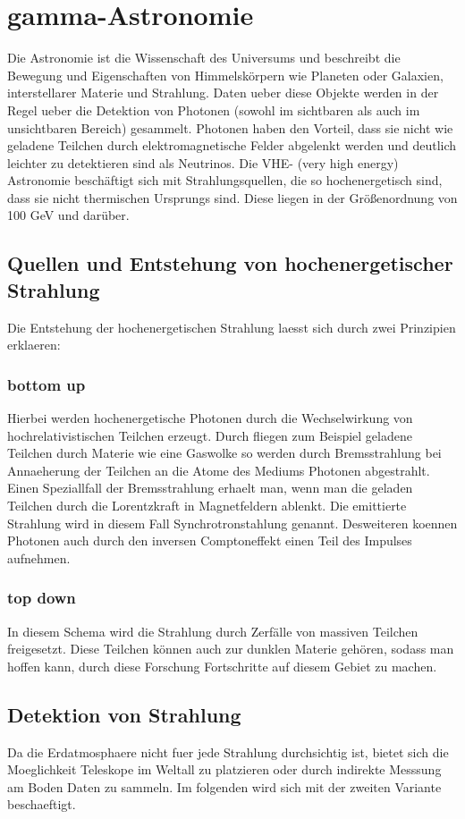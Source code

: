 \chapter{gamma-Astronomie}
Die Astronomie ist die Wissenschaft des Universums und beschreibt die Bewegung und Eigenschaften von Himmelskörpern wie Planeten oder Galaxien, interstellarer Materie und Strahlung. Daten ueber diese Objekte werden in der Regel ueber die Detektion von Photonen (sowohl im sichtbaren als auch im unsichtbaren Bereich) gesammelt. Photonen haben den Vorteil, dass sie nicht wie geladene Teilchen durch elektromagnetische Felder abgelenkt werden und deutlich leichter zu detektieren sind als Neutrinos. Die VHE- (very high energy) Astronomie beschäftigt sich mit Strahlungsquellen, die so hochenergetisch sind, dass sie nicht thermischen Ursprungs sind. Diese liegen in der Größenordnung von 100 GeV und darüber.%

\section{Quellen und Entstehung von hochenergetischer Strahlung}
Die Entstehung der hochenergetischen Strahlung laesst sich durch zwei Prinzipien erklaeren:
\subsection{bottom up}
Hierbei werden hochenergetische Photonen durch die Wechselwirkung von hochrelativistischen Teilchen erzeugt. Durch fliegen zum Beispiel geladene Teilchen durch Materie wie eine Gaswolke so werden durch Bremsstrahlung bei Annaeherung der Teilchen an die Atome des Mediums Photonen abgestrahlt. Einen Speziallfall der Bremsstrahlung erhaelt man, wenn man die geladen Teilchen durch die Lorentzkraft in Magnetfeldern ablenkt. Die emittierte Strahlung wird in diesem Fall Synchrotronstahlung genannt. Desweiteren koennen Photonen auch durch den inversen Comptoneffekt einen Teil des Impulses aufnehmen. %
\subsection{top down}
In diesem Schema wird die Strahlung durch Zerfälle von massiven Teilchen freigesetzt. Diese Teilchen können auch zur dunklen Materie gehören, sodass man hoffen kann, durch diese Forschung Fortschritte auf diesem Gebiet zu machen.

\section{Detektion von Strahlung}
Da die Erdatmosphaere nicht fuer jede Strahlung durchsichtig ist, bietet sich die Moeglichkeit Teleskope im Weltall zu platzieren oder durch indirekte Messsung am Boden Daten zu sammeln. Im folgenden wird sich mit der zweiten Variante beschaeftigt.

